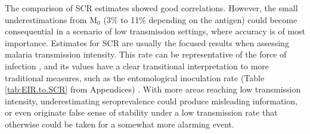 The comparison of SCR estimates showed good correlations.
However, the small underestimations from M$_{0}$ (3\% to 11\% depending on the antigen) could become consequential in a scenario of low transmission settings, where accuracy is of most importance.
Estimates for SCR are usually the focused results when assessing malaria transmission intensity.
This rate can be representative of the force of infection \cite{hens2012modeling}, and its values have a clear transitional interpretation to more traditional measures, such as the entomological inoculation rate (Table \ref{tab:EIR.to.SCR} from Appendices) \cite{bodker2003relationship,drakeley2005estimating}.
With more areas reaching low transmission intensity, underestimating seroprevalence could produce misleading information, or even originate false sense of stability under a low transmission rate that otherwise could be taken for a somewhat more alarming event.

